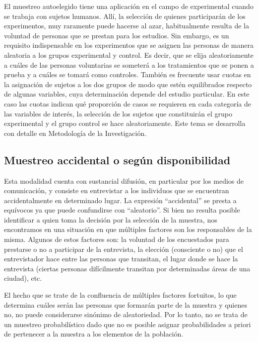 \documentclass[]{book}
\begin{document}
El muestreo autoelegido tiene una aplicación en el campo de experimental
cuando se trabaja con sujetos humanos. Allí, la selección de quienes
participarán de los experimentos, muy raramente puede hacerse al azar,
habitualmente resulta de la voluntad de personas que se prestan para los
estudios. Sin embargo, es un requisito indispensable en los experimentos
que se asignen las personas de manera aleatoria a los grupos
experimental y control. Es decir, que se elija aleatoriamente a cuáles
de las personas voluntarias se someterá a los tratamientos que se ponen
a prueba y a cuáles se tomará como controles. También es frecuente usar
cuotas en la asignación de sujetos a los dos grupos de modo que estén
equilibrados respecto de algunas variables, cuya determinación depende
del estudio particular. En este caso las cuotas indican qué proporción
de casos se requieren en cada categoría de las variables de interés, la
selección de los sujetos que constituirán el grupo experimental y el
grupo control se hace aleatoriamente. Este tema se desarrolla con
detalle en Metodología de la Investigación.

\hypertarget{muestreo-accidental-o-segun-disponibilidad}{%
\subsection{Muestreo accidental o según disponibilidad}\label{muestreo-accidental-o-segun-disponibilidad}}

Esta modalidad cuenta con sustancial difusión, en particular por los
medios de comunicación, y consiste en entrevistar a los individuos que
se encuentran accidentalmente en determinado lugar. La expresión
``accidental'' se presta a equívocos ya que puede confundirse con
``aleatorio''. Si bien no resulta posible identificar a quien toma la
decisión por la selección de la muestra, nos encontramos en una
situación en que múltiples factores son los responsables de la misma.
Algunos de estos factores son: la voluntad de los encuestados para
prestarse o no a participar de la entrevista, la elección (consciente o
no) que el entrevistador hace entre las personas que transitan, el lugar
donde se hace la entrevista (ciertas personas difícilmente transitan por
determinadas áreas de una ciudad), etc.

El hecho que se trate de la confluencia de múltiples factores fortuitos,
lo que determina cuáles serán las personas que formarán parte de la
muestra y quienes no, no puede considerarse sinónimo de aleatoriedad.
Por lo tanto, no se trata de un muestreo probabilístico dado que no es
posible asignar probabilidades a priori de pertenecer a la muestra a los
elementos de la población.
\end{document}
